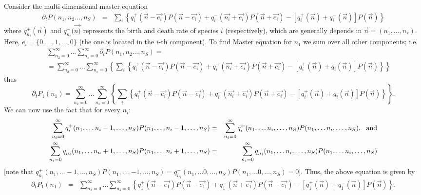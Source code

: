 \documentclass[9pt,twoside,lineno]{pnas-new}
\begin{document}
Consider the multi-dimensional  master equation 
\begin{eqnarray}
    \partial_tP(n_1,n_2\dots,n_S) &=& \sum_{i}\left\{ q_{i}^+(\vec{n}-\vec{e_i})P(\vec{n}-\vec{e_i})+q^-_{i}(\vec{n_i}+\vec{e_i}) P(\vec{n}+\vec{e_i})-\left[q_{i}^+(\vec{n})+q_{i}^-(\vec{n}) \right]P(\vec{n}) \right\}
\end{eqnarray}
 where $q^+_{n_i}(\vec{n})$ and $q^-_{n_i}(\vec{n)}$ represents the birth and death rate of species $i$ (respectively), which are generally depends in $\vec{n}=(n_1,\dots, n_s)$. Here, $e_i=\{0, \dots, 1, \dots , 0\}$ (the one is located in the $i$-th component). 
 To find Master equation for $n_1$ we sum over all other components; i.e. 
\begin{eqnarray}
  &&\sum_{n_2=0}^{\infty}\dots \sum_{n_s=0}^{\infty}  \partial_tP(n_1,n_2\dots,n_S) = \\ \nonumber &&=  \sum_{n_2=0}^{\infty}\dots \sum_{n_s=0}^{\infty} \left\{\sum_{i}\left\{ q_{i}^+(\vec{n}-\vec{e_i})P(\vec{n}-\vec{e_i})+q^-_{i}(\vec{n_i}+\vec{e_i}) P(\vec{n}+\vec{e_i})-\left[q_{i}^+(\vec{n})+q_{i}(\vec{n}) \right]P(\vec{n}) \right\}\right\} 
  \end{eqnarray}
  thus
  \begin{equation}
     \partial_t P_1(n_1) = \sum_{n_2=0}^{\infty}\dots \sum_{n_s=0}^{\infty} \left\{\sum_{i}\left\{ q_{i}^+(\vec{n}-\vec{e_i})P(\vec{n}-\vec{e_i})+q^-_{i}(\vec{n_i}+\vec{e_i}) P(\vec{n}+\vec{e_i})-\left[q_{i}^+(\vec{n})+q_{i}(\vec{n}) \right]P(\vec{n}) \right\}\right\} .
  \end{equation}
  We can now use the fact that for every $n_i$:
 \begin{eqnarray}
      \sum_{n_i=0}^{\infty}  q_{i}^+(n_1, \dots n_i-1, \dots, n_S)P(n_1, \dots n_i-1, \dots, n_S) &=& \sum_{n_i=0}^{\infty}  q_{i}^+(n_1, \dots n_i, \dots, n_S)P(n_1, \dots n_i, \dots, n_S)
,  {\rm \ \ and} \\ \nonumber
 \sum_{n_i=0}^{\infty}  q_{n_i}^-(n_1, \dots n_n+1, \dots, n_S)P(n_1, \dots n_i+1, \dots, n_S)&=& \sum_{n_i=0}^{\infty}  q_{n_i}^-(n_1, \dots n_i, \dots, n_S)P(n_1, \dots n_i, \dots, n_S)
 \end{eqnarray}
  [note that   $q_{n_i}^+(n_1, \dots -1, \dots, n_S)P(n_1, \dots, -1, \dots, n_S)=q_{n_i}^-(n_1, \dots 0, \dots, n_S)P(n_1, \dots 0, \dots, n_S)=0$]. Thus, the above equation is given by
\begin{eqnarray}
  \partial_t P_1(n_1) &=& \sum_{n_2=0}^{\infty}\dots \sum_{n_s=0}^{\infty} \left\{ q_{1}^+(\vec{n}-\vec{e_1})P(\vec{n}-\vec{e_1})+q^-_{1}(\vec{n}+\vec{e_1}) P(\vec{n}+\vec{e_1})-\left[q_{1}^+(\vec{n})+q^-_{1}(\vec{n}) \right]P(\vec{n})\right\}.
\end{eqnarray}
\end{document}
